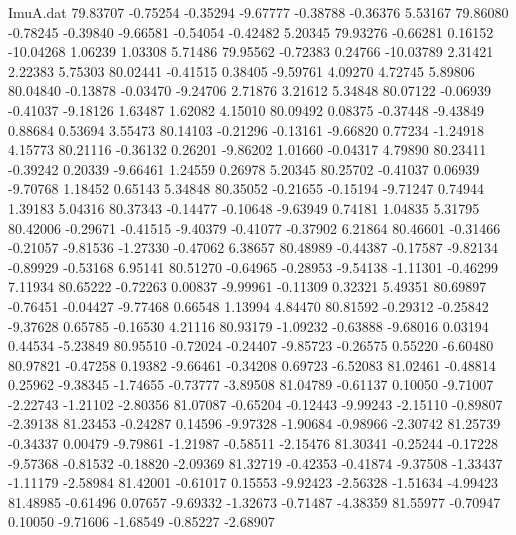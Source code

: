 \begin{filecontents}{ImuA.dat}
  79.83707   -0.75254   -0.35294   -9.67777   -0.38788   -0.36376    5.53167
  79.86080   -0.78245   -0.39840   -9.66581   -0.54054   -0.42482    5.20345
  79.93276   -0.66281    0.16152  -10.04268    1.06239    1.03308    5.71486
  79.95562   -0.72383    0.24766  -10.03789    2.31421    2.22383    5.75303
  80.02441   -0.41515    0.38405   -9.59761    4.09270    4.72745    5.89806
  80.04840   -0.13878   -0.03470   -9.24706    2.71876    3.21612    5.34848
  80.07122   -0.06939   -0.41037   -9.18126    1.63487    1.62082    4.15010
  80.09492    0.08375   -0.37448   -9.43849    0.88684    0.53694    3.55473
  80.14103   -0.21296   -0.13161   -9.66820    0.77234   -1.24918    4.15773
  80.21116   -0.36132    0.26201   -9.86202    1.01660   -0.04317    4.79890
  80.23411   -0.39242    0.20339   -9.66461    1.24559    0.26978    5.20345
  80.25702   -0.41037    0.06939   -9.70768    1.18452    0.65143    5.34848
  80.35052   -0.21655   -0.15194   -9.71247    0.74944    1.39183    5.04316
  80.37343   -0.14477   -0.10648   -9.63949    0.74181    1.04835    5.31795
  80.42006   -0.29671   -0.41515   -9.40379   -0.41077   -0.37902    6.21864
  80.46601   -0.31466   -0.21057   -9.81536   -1.27330   -0.47062    6.38657
  80.48989   -0.44387   -0.17587   -9.82134   -0.89929   -0.53168    6.95141
  80.51270   -0.64965   -0.28953   -9.54138   -1.11301   -0.46299    7.11934
  80.65222   -0.72263    0.00837   -9.99961   -0.11309    0.32321    5.49351
  80.69897   -0.76451   -0.04427   -9.77468    0.66548    1.13994    4.84470
  80.81592   -0.29312   -0.25842   -9.37628    0.65785   -0.16530    4.21116
  80.93179   -1.09232   -0.63888   -9.68016    0.03194    0.44534   -5.23849
  80.95510   -0.72024   -0.24407   -9.85723   -0.26575    0.55220   -6.60480
  80.97821   -0.47258    0.19382   -9.66461   -0.34208    0.69723   -6.52083
  81.02461   -0.48814    0.25962   -9.38345   -1.74655   -0.73777   -3.89508
  81.04789   -0.61137    0.10050   -9.71007   -2.22743   -1.21102   -2.80356
  81.07087   -0.65204   -0.12443   -9.99243   -2.15110   -0.89807   -2.39138
  81.23453   -0.24287    0.14596   -9.97328   -1.90684   -0.98966   -2.30742
  81.25739   -0.34337    0.00479   -9.79861   -1.21987   -0.58511   -2.15476
  81.30341   -0.25244   -0.17228   -9.57368   -0.81532   -0.18820   -2.09369
  81.32719   -0.42353   -0.41874   -9.37508   -1.33437   -1.11179   -2.58984
  81.42001   -0.61017    0.15553   -9.92423   -2.56328   -1.51634   -4.99423
  81.48985   -0.61496    0.07657   -9.69332   -1.32673   -0.71487   -4.38359
  81.55977   -0.70947    0.10050   -9.71606   -1.68549   -0.85227   -2.68907

\end{filecontents}

